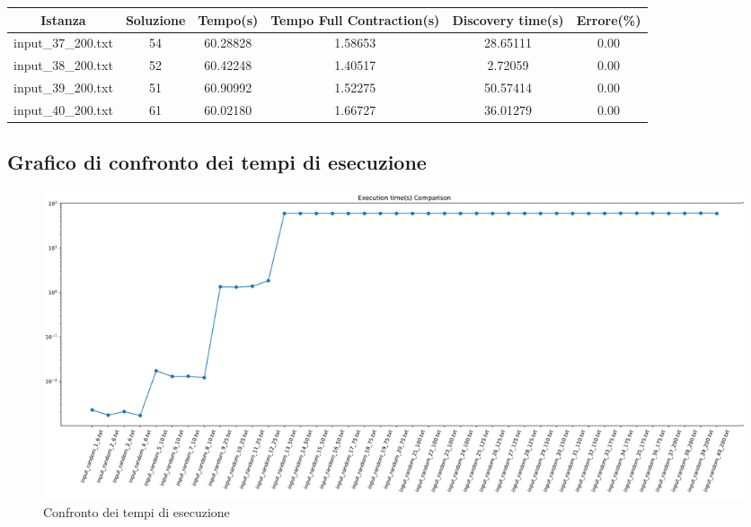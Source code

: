 \begin{center}
	\begin{tabular}{|c|c|c|c|c|c|}
		\hline
		\parbox{2cm}{\centering Istanza} & {Soluzione} & {Tempo(s)} & \parbox{2.75cm}{\vspace{.1cm}\centering Tempo Full Contraction(s)\vspace{.1cm}} & \parbox{2cm}{\centering Discovery time(s)} & {Errore(\%)}\\\hline
		input\_37\_200.txt & 54 & 60.28828 & 1.58653 & 28.65111 & 0.00\\\hline
		input\_38\_200.txt & 52 & 60.42248 & 1.40517 & 2.72059 & 0.00\\\hline
		input\_39\_200.txt & 51 & 60.90992 & 1.52275 & 50.57414 & 0.00\\\hline
		input\_40\_200.txt & 61 & 60.02180 & 1.66727 & 36.01279 & 0.00\\\hline
	\end{tabular}
\end{center}

\subsection{Grafico di confronto dei tempi di esecuzione}
\begin{center}
	\begin{figure}[H]
		\centering
		\hspace{-1cm}\includegraphics[width=\linewidth]{Img/exec_time_graph.jpg}
		\caption{Confronto dei tempi di esecuzione}
	\end{figure}
\end{center}

